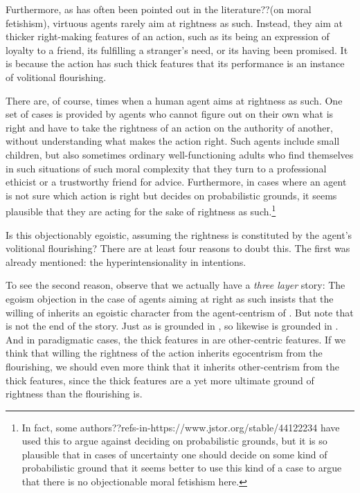 Furthermore, as has often been pointed out in the literature??(on moral fetishism), virtuous agents rarely aim at 
rightness as such. Instead, they aim at thicker right-making features of an action, such as its being an expression
of loyalty to a friend, its fulfilling a stranger's need, or its having been promised. It is because the action has
such thick features that its performance is an instance of volitional flourishing. 

There are, of course, times when a human agent aims at rightness as such. One set of cases is provided by agents who cannot
figure out on their own what is right and have to take the rightness of an action on the authority of another, without
understanding what makes the action right. Such agents include small children, but also sometimes ordinary well-functioning
adults who find themselves in such situations of such moral complexity that they turn to a professional ethicist or a 
trustworthy friend for advice. Furthermore, in cases where an agent is not sure which action is right but decides on
probabilistic grounds, it seems plausible that they are acting for the sake of rightness as such.\footnote{In fact, some
authors??refs-in-https://www.jstor.org/stable/44122234 have used this to argue against deciding on probabilistic grounds,
but it is  so plausible that in cases of uncertainty one should decide on some kind of probabilistic ground that it seems
better to use this kind of a case to argue that there is no objectionable moral fetishism here.}

Is this objectionably egoistic, assuming the rightness is constituted by the agent's volitional
flourishing? There are at least four reasons to doubt this. The first was already mentioned: the hyperintensionality in 
intentions.

To see the second reason, observe that we actually have a \textit{three layer} story:
The egoism objection in the case of agents aiming at right as such insists that the willing of  inherits 
an egoistic character from the agent-centrism of . But note that  is not the end of the story. Just as 
 is grounded in 
, so likewise  is grounded in . And in paradigmatic cases, the thick features in  
are other-centric features. If we think that willing the rightness of the action inherits egocentrism from the flourishing, we should even more 
think that it inherits  other-centrism from the thick features, since the thick features are a yet more ultimate ground of rightness
than the flourishing is.

